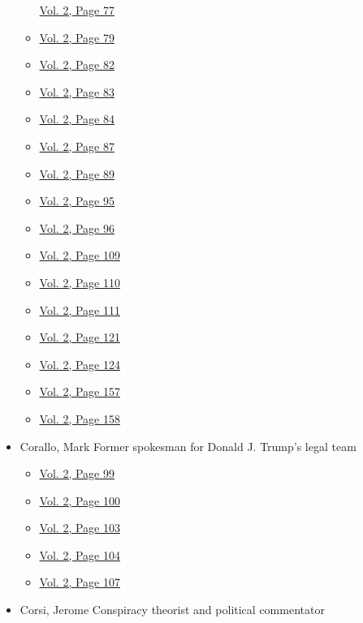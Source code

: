 \begin{itemize}
\begin{itemize}
    \protect\hyperlink{g-page-289}{Vol. 2, Page 77}
  \item
    \protect\hyperlink{g-page-291}{Vol. 2, Page 79}
  \item
    \protect\hyperlink{g-page-294}{Vol. 2, Page 82}
  \item
    \protect\hyperlink{g-page-295}{Vol. 2, Page 83}
  \item
    \protect\hyperlink{g-page-296}{Vol. 2, Page 84}
  \item
    \protect\hyperlink{g-page-299}{Vol. 2, Page 87}
  \item
    \protect\hyperlink{g-page-301}{Vol. 2, Page 89}
  \item
    \protect\hyperlink{g-page-307}{Vol. 2, Page 95}
  \item
    \protect\hyperlink{g-page-308}{Vol. 2, Page 96}
  \item
    \protect\hyperlink{g-page-321}{Vol. 2, Page 109}
  \item
    \protect\hyperlink{g-page-322}{Vol. 2, Page 110}
  \item
    \protect\hyperlink{g-page-323}{Vol. 2, Page 111}
  \item
    \protect\hyperlink{g-page-333}{Vol. 2, Page 121}
  \item
    \protect\hyperlink{g-page-336}{Vol. 2, Page 124}
  \item
    \protect\hyperlink{g-page-369}{Vol. 2, Page 157}
  \item
    \protect\hyperlink{g-page-370}{Vol. 2, Page 158}
  \end{itemize}
\item
  Corallo, Mark Former spokesman for Donald J. Trump's legal team

  \begin{itemize}
  \tightlist
  \item
    \protect\hyperlink{g-page-311}{Vol. 2, Page 99}
  \item
    \protect\hyperlink{g-page-312}{Vol. 2, Page 100}
  \item
    \protect\hyperlink{g-page-315}{Vol. 2, Page 103}
  \item
    \protect\hyperlink{g-page-316}{Vol. 2, Page 104}
  \item
    \protect\hyperlink{g-page-319}{Vol. 2, Page 107}
  \end{itemize}
\item
  Corsi, Jerome Conspiracy theorist and political commentator


\end{itemize}
